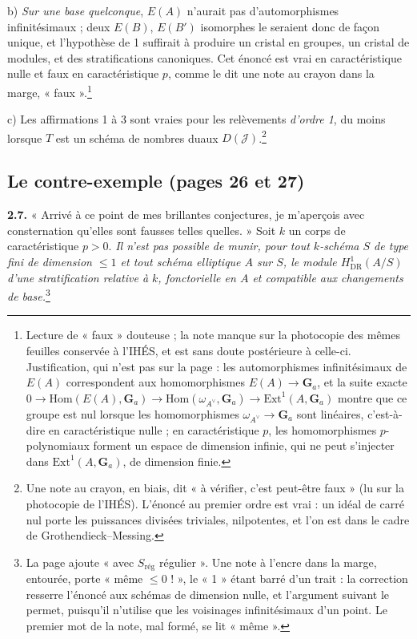 \documentclass[11pt,a4paper]{article}
\begin{document}
b) \emph{Sur une base quelconque}, $E(A)$ n'aurait pas d'automorphismes
infinitésimaux ; deux $E(B)$, $E(B')$ isomorphes le seraient donc de façon
unique, et l'hypothèse de 1 suffirait à produire un cristal en groupes, un
cristal de modules, et des stratifications canoniques. Cet énoncé est vrai en
caractéristique nulle et faux en caractéristique $p$, comme le dit une note au
crayon dans la marge, « faux ».\footnote{Lecture de « faux » douteuse ; la
note manque sur la photocopie des mêmes feuilles conservée à l'IHÉS, et est
sans doute postérieure à celle-ci.
Justification, qui n'est pas sur la page : les automorphismes infinitésimaux de
$E(A)$ correspondent aux homomorphismes $E(A) \to \mathbf{G}_a$, et la
suite exacte $0 \to \mathrm{Hom}(E(A), \mathbf{G}_a) \to \mathrm{Hom}(\omega_{A^\vee},
\mathbf{G}_a) \to \mathrm{Ext}^1(A, \mathbf{G}_a)$ montre que ce groupe est nul
lorsque les homomorphismes $\omega_{A^\vee} \to \mathbf{G}_a$ sont linéaires,
c'est-à-dire en caractéristique nulle ; en caractéristique $p$, les
homomorphismes $p$-polynomiaux forment un espace de dimension infinie, qui ne
peut s'injecter dans $\mathrm{Ext}^1(A, \mathbf{G}_a)$, de dimension finie.}

c) Les affirmations 1 à 3 sont vraies pour les relèvements \emph{d'ordre 1},
du moins lorsque $T$ est un schéma de nombres duaux
$D(\mathcal{J})$.\footnote{Une note au crayon, en biais, dit « à vérifier,
c'est peut-être faux » (lu sur la photocopie de l'IHÉS). L'énoncé
au premier ordre est vrai : un idéal de carré nul porte les puissances
divisées triviales, nilpotentes, et l'on est dans le cadre de
Grothendieck--Messing.}

\subsection*{Le contre-exemple (pages 26 et 27)}

\textbf{2.7.} « Arrivé à ce point de mes brillantes conjectures, je m'aperçois
avec consternation qu'elles sont fausses telles quelles. » Soit $k$ un corps de
caractéristique $p > 0$. \emph{Il n'est pas possible de munir, pour tout
$k$-schéma $S$ de type fini de dimension $\leq 1$ et tout schéma elliptique $A$
sur $S$, le module $H^1_{\mathrm{DR}}(A/S)$ d'une stratification relative à
$k$, fonctorielle en $A$ et compatible aux changements de base.}\footnote{La
page ajoute « avec $S_{\text{rég}}$ régulier ». Une note à l'encre dans la
marge, entourée, porte « même $\leq 0$ ! », le « 1 » étant barré d'un trait : la
correction resserre l'énoncé aux schémas de dimension nulle, et l'argument
suivant le permet, puisqu'il n'utilise que les voisinages infinitésimaux d'un
point. Le premier mot de la note, mal formé, se lit « même ».}
\end{document}
